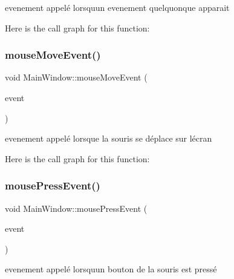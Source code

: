 evenement appelé lorsqu\textquotesingle{}un evenement quelquonque apparait 

Here is the call graph for this function\+:
\mbox{\label{class_main_window_a2cf42454562815dd44c716e78d515697}} 
\subsubsection{\texorpdfstring{mouse\+Move\+Event()}{mouseMoveEvent()}}
{\footnotesize\ttfamily void Main\+Window\+::mouse\+Move\+Event (\begin{DoxyParamCaption}\item[{Q\+Mouse\+Event $\ast$}]{event }\end{DoxyParamCaption})\hspace{0.3cm}{\ttfamily [protected]}}



evenement appelé lorsque la souris se déplace sur l\textquotesingle{}écran 

Here is the call graph for this function\+:
\mbox{\label{class_main_window_a2b5463ae209a03d1680b39c950dac8be}} 
\subsubsection{\texorpdfstring{mouse\+Press\+Event()}{mousePressEvent()}}
{\footnotesize\ttfamily void Main\+Window\+::mouse\+Press\+Event (\begin{DoxyParamCaption}\item[{Q\+Mouse\+Event $\ast$}]{event }\end{DoxyParamCaption})\hspace{0.3cm}{\ttfamily [protected]}}



evenement appelé lorsqu\textquotesingle{}un bouton de la souris est pressé 

\mbox{\label{class_main_window_a32bbb036a55856e49c31a5348f937b53}} 

